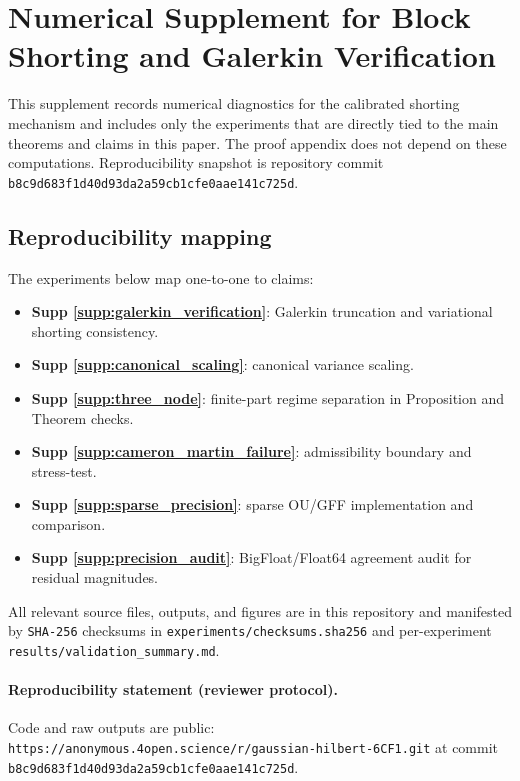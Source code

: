 
\section{Numerical Supplement for Block Shorting and Galerkin Verification}
\label{supp:numerical}

This supplement records numerical diagnostics for the calibrated shorting
mechanism and includes only the experiments that are directly tied to the main
theorems and claims in this paper.
The proof appendix does not depend on these computations.
Reproducibility snapshot is repository commit
\texttt{b8c9d683f1d40d93da2a59cb1cfe0aae141c725d}.

\subsection*{Reproducibility mapping}
\label{supp:repro_mapping}
The experiments below map one-to-one to claims:
\begin{itemize}
    \item \textbf{Supp \ref{supp:galerkin_verification}}: Galerkin truncation
    and variational shorting consistency.
    \item \textbf{Supp \ref{supp:canonical_scaling}}: canonical variance scaling.
    \item \textbf{Supp \ref{supp:three_node}}: finite-part regime separation in
    Proposition and Theorem checks.
    \item \textbf{Supp \ref{supp:cameron_martin_failure}}: admissibility
    boundary and stress-test.
    \item \textbf{Supp \ref{supp:sparse_precision}}: sparse OU/GFF implementation
    and comparison.
    \item \textbf{Supp \ref{supp:precision_audit}}: BigFloat/Float64 agreement
    audit for residual magnitudes.
\end{itemize}

All relevant source files, outputs, and figures are in this repository and
manifested by \texttt{SHA-256} checksums in
\texttt{experiments/checksums.sha256} and per-experiment
\texttt{results/validation\_summary.md}.

\paragraph{Reproducibility statement (reviewer protocol).}
Code and raw outputs are public:
\texttt{https://anonymous.4open.science/r/gaussian-hilbert-6CF1.git} at commit
\texttt{b8c9d683f1d40d93da2a59cb1cfe0aae141c725d}.

